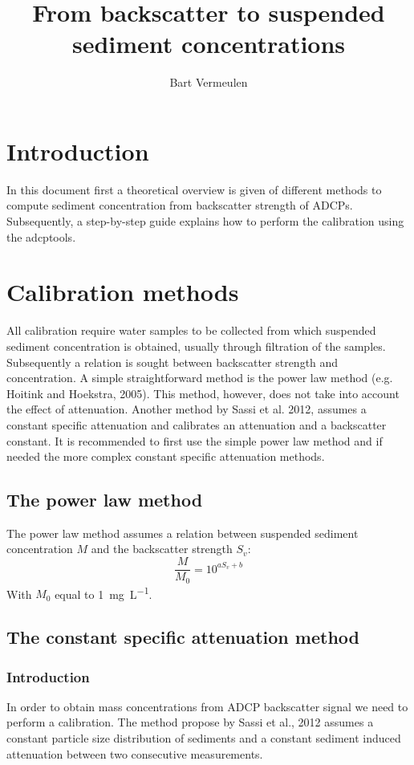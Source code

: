 \documentclass[]{artikel3}
\title{From backscatter to suspended sediment concentrations}
\author{Bart Vermeulen}
\begin{document}
\maketitle

\section{Introduction}
In this document first a theoretical overview is given of different methods to compute sediment concentration from backscatter strength of ADCPs. Subsequently, a step-by-step guide explains how to perform the calibration using the adcptools.

\section{Calibration methods}
All calibration require water samples to be collected from which suspended sediment concentration is obtained, usually through filtration of the samples. Subsequently a relation is sought between backscatter strength and concentration.
A simple straightforward method is the power law method (e.g. Hoitink and Hoekstra, 2005). This method, however, does not take into account the effect of attenuation.  Another method by Sassi et al. 2012, assumes a constant specific attenuation and calibrates an attenuation and a backscatter constant. It is recommended to first use the simple power law method and if needed the more complex constant specific attenuation methods.
\subsection{The power law method}
The power law method assumes a relation between suspended sediment concentration $M$ and the backscatter strength $S_v$:
\begin{equation}
  \frac{M}{M_0}=10^{aS_v+b}
\end{equation}
With $M_0$ equal to \SI{1}{\milli\g\per\liter}.
\subsection{The constant specific attenuation method}

\subsubsection{Introduction}
In order to obtain mass concentrations from ADCP backscatter signal we need to perform a calibration. The method propose by Sassi et al., 2012 assumes a constant particle size distribution of sediments and a constant sediment induced attenuation between two consecutive measurements.
\end{document}
